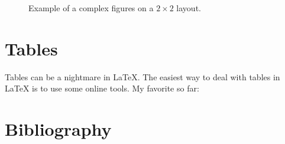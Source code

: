 \begin{figure}[!h]
\begin{subfigure}[t]{.5\textwidth}
  \end{subfigure}
  \caption{Example of a complex figures on a $2\times2$ layout.}
  \label{fig:drake}
\end{figure}

\section{Tables}
Tables can be a nightmare in LaTeX.
The easiest way to deal with tables in LaTeX is to use some online tools.
My favorite so far: 

\section{Bibliography}
